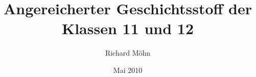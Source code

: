 \documentclass[%
    a4paper,%
    twoside,%
    openright,%
    ngerman,%
    headsepline,%
    headings=normal,
    BCOR=23mm,%
    toc=index,%
    toc=flat,
    draft%
]{scrbook}
\title{Angereicherter Geschichtsstoff der Klassen 11 und 12}
\author{Richard Möhn}
\date{Mai 2010}
\begin{document}
\thispagestyle{empty}
\thispagestyle{empty}

\maketitle

\frontmatter
\tableofcontents



\mainmatter





\appendix



\backmatter
\begin{flushleft}

\end{flushleft}

\printbibliography[heading=bibintoc]
\nocite{braunesGeschichts}
\nocite{WeltgeschNeuz}
\end{document}

